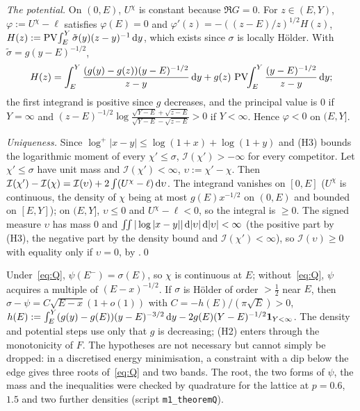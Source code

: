 \emph{The potential.} On $(0,E)$, $U^\chi$ is constant because $\Re G=0$. For $z\in(E,Y)$, $\varphi:=U^\chi-\ell$ satisfies $\varphi(E)=0$ and
$\varphi'(z)=-((z-E)/z)^{1/2}H(z)$, $H(z):=\operatorname{PV}\!\int_E^Y\tilde\sigma(y)(z-y)^{-1}\,\mathrm{d} y$, which exists since $\sigma$ is locally H\"older. With $\tilde\sigma=g(y-E)^{-1/2}$,
\[
  H(z)=\int_E^Y\frac{(g(y)-g(z))(y-E)^{-1/2}}{z-y}\,\mathrm{d} y+g(z)\,\operatorname{PV}\!\!\int_E^Y\frac{(y-E)^{-1/2}}{z-y}\,\mathrm{d} y ;
\]
the first integrand is positive since $g$ decreases, and the principal value is $0$ if $Y=\infty$ and
$(z-E)^{-1/2}\log\frac{\sqrt{Y-E}+\sqrt{z-E}}{\sqrt{Y-E}-\sqrt{z-E}}>0$ if $Y<\infty$. Hence $\varphi<0$ on $(E,Y]$.

\emph{Uniqueness.} Since $\log^+|x-y|\le\log(1+x)+\log(1+y)$ and (H3) bounds the logarithmic moment of every $\chi'\le\sigma$, $\mathcal I(\chi')>-\infty$ for every
competitor. Let $\chi'\le\sigma$ have unit mass and $\mathcal I(\chi')<\infty$, $\upsilon:=\chi'-\chi$. Then $\mathcal I(\chi')-\mathcal I(\chi)=\mathcal I(\upsilon)+2\int(U^\chi-\ell)\,\mathrm{d}\upsilon$. The
integrand vanishes on $[0,E]$ ($U^\chi$ is continuous, the density of $\chi$ being at most $g(E)x^{-1/2}$ on $(0,E)$ and bounded on $[E,Y]$); on
$(E,Y]$, $\upsilon\le0$ and $U^\chi-\ell<0$, so the integral is $\ge0$. The signed measure $\upsilon$ has mass $0$ and
$\iint|\log|x-y||\,\mathrm{d}|\upsilon|\,\mathrm{d}|\upsilon|<\infty$ (the positive part by (H3), the negative part by the density bound and $\mathcal I(\chi')<\infty$), so
$\mathcal I(\upsilon)\ge0$ with equality only if $\upsilon=0$, by \cite[Lemma~3.3]{PaperI}.\qed

\begin{remark}\label{rem:Qedge}
Under~\eqref{eq:Q}, $\psi(E^-)=\sigma(E)$, so $\chi$ is continuous at $E$; without~\eqref{eq:Q}, $\psi$ acquires a multiple of $(E-x)^{-1/2}$. If $\sigma$
is H\"older of order $>\frac12$ near $E$, then $\sigma-\psi=C\sqrt{E-x}(1+o(1))$ with $C=-h(E)/(\pi\sqrt E)>0$,
$h(E):=\int_E^Y(g(y)-g(E))(y-E)^{-3/2}\,\mathrm{d} y-2g(E)(Y-E)^{-1/2}\mathbf 1_{Y<\infty}$. The density and potential steps use only that $g$ is
decreasing; (H2) enters through the monotonicity of $F$. The hypotheses are not necessary but cannot simply be dropped: in a discretised energy
minimisation, a constraint with a dip below the edge gives three roots of~\eqref{eq:Q} and two bands. The root, the two forms of $\psi$, the
mass and the inequalities were checked by quadrature for the lattice at $p=0.6$, $1.5$ and two further densities (script
\texttt{m1\_theoremQ}).
\end{remark}
